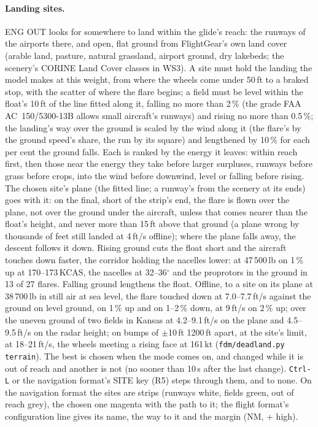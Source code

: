 \documentclass[11pt,a4paper,oneside]{book}
\newcommand{\key}[1]{\texttt{#1}}
\begin{document}
\paragraph{Landing sites.} ENG OUT looks for somewhere to land within the glide's reach: the runways of the airports
there, and open, flat ground from FlightGear's own land cover (arable land, pasture, natural grassland, airport ground,
dry lakebeds; the scenery's CORINE Land Cover classes in WS3). A site must hold the landing the model makes at this
weight, from where the wheels come under 50\,ft to a braked stop, with the scatter of where the flare begins; a field
must be level within the float's 10\,ft of the line fitted along it, falling no more than 2\,\% (the grade FAA
AC~150/5300-13B allows small aircraft's runways) and rising no more than 0.5\,\%; the landing's way over the ground
is scaled by the wind along it (the flare's by the ground speed's share, the run by its square) and lengthened by
10\,\% for each per cent the ground falls. Each is ranked by the energy it leaves: within reach first, then those
near the energy they take before larger surpluses, runways before grass before crops, into the wind before downwind,
level or falling before rising. The chosen site's plane (the fitted line; a runway's from the scenery at its ends)
goes with it: on the final, short of the strip's end, the flare is flown over the plane, not over the ground under
the aircraft, unless that comes nearer than the float's height, and never more than 15\,ft above that ground (a plane
wrong by thousands of feet still landed at 4\,ft/s offline); where the plane falls away, the descent follows it down.
Rising ground cuts the float short and the aircraft touches down faster, the corridor holding the nacelles lower: at
47\,500\,lb on 1\,\% up at 170--173\,KCAS, the nacelles at 32--36$^\circ$ and the proprotors in the ground in 13 of 27
flares. Falling ground lengthens the float. Offline, to a site on its plane at 38\,700\,lb in still air at sea level,
the flare touched down at 7.0--7.7\,ft/s against the ground on level ground, on 1\,\% up and on 1--2\,\% down, at
9\,ft/s on 2\,\% up; over the uneven ground of two fields in Kansas at 4.2--9.1\,ft/s on the plane and 4.5--9.5\,ft/s
on the radar height; on bumps of $\pm$10\,ft 1200\,ft apart, at the site's limit, at 18--21\,ft/s, the wheels meeting
a rising face at 161\,kt (\texttt{fdm/deadland.py terrain}). The best is chosen
when the mode comes on, and changed while it is out of reach and another is not (no sooner than 10\,s after the last
change). \key{Ctrl-L} or the navigation format's SITE key (R5) steps through them,
and to none. On the navigation format the sites are strips (runways white, fields green, out of reach grey), the
chosen one magenta with the path to it; the flight format's configuration line gives its name, the way to it and the
margin (NM, + high).
\end{document}
